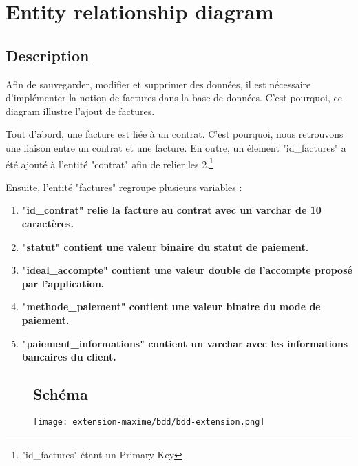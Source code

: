 \section{Entity relationship diagram}
\subsection{Description}

\begin{flushleft}
Afin de sauvegarder, modifier et supprimer des données, il est nécessaire d'implémenter la notion de factures dans la base de données. C'est pourquoi, ce diagram illustre l'ajout de factures.
\end{flushleft}

\begin{flushleft}
Tout d'abord, une facture est liée à un contrat. C'est pourquoi, nous retrouvons une liaison entre un contrat et une facture. En outre, un élement "id_factures" a été ajouté à l'entité "contrat" afin de relier les 2.\footnote{"id_factures" étant un Primary Key}
\end{flushleft}

\begin{flushleft}
Ensuite, l'entité "factures" regroupe plusieurs variables : 
\end{flushleft}
\begin{enumerate}[-]

\item \textbf{"id_contrat" relie la facture au contrat avec un varchar de 10 caractères.}

\item \textbf{"statut" contient une valeur binaire du statut de paiement.}

\item \textbf{"ideal_accompte" contient une valeur double de l'accompte proposé par l'application.}

\item \textbf{"methode_paiement" contient une valeur binaire du mode de paiement.}

\item \textbf{"paiement_informations" contient un varchar avec les informations bancaires du client.}

\end{enumerate}

\begin{figure}[h]
\subsection{Schéma}
\centering
\texttt{[image: extension-maxime/bdd/bdd-extension.png]}
\end{figure}
